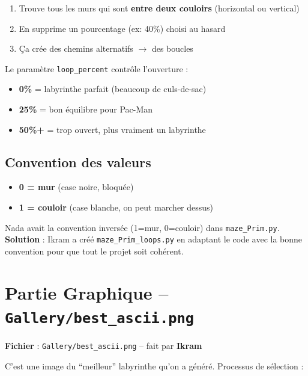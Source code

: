 \documentclass[12pt,a4paper]{article}
\begin{document}
\begin{enumerate}
    \item Trouve tous les murs qui sont \textbf{entre deux couloirs} (horizontal ou vertical)
    \item En supprime un pourcentage (ex: 40\%) choisi au hasard
    \item Ça crée des chemins alternatifs $\rightarrow$ des boucles
\end{enumerate}

Le paramètre \texttt{loop\_percent} contrôle l'ouverture :
\begin{itemize}
    \item \textbf{0\%} = labyrinthe parfait (beaucoup de culs-de-sac)
    \item \textbf{25\%} = bon équilibre pour Pac-Man
    \item \textbf{50\%+} = trop ouvert, plus vraiment un labyrinthe
\end{itemize}

\subsection{Convention des valeurs}

\begin{itemize}
    \item \textbf{0 = mur} (case noire, bloquée)
    \item \textbf{1 = couloir} (case blanche, on peut marcher dessus)
\end{itemize}

\begin{problemebox}
Nada avait la convention inversée (1=mur, 0=couloir) dans \texttt{maze\_Prim.py}. \textbf{Solution} : Ikram a créé \texttt{maze\_Prim\_loops.py} en adaptant le code avec la bonne convention pour que tout le projet soit cohérent.
\end{problemebox}

\section{Partie Graphique -- \texttt{Gallery/best\_ascii.png}}

\textbf{Fichier} : \texttt{Gallery/best\_ascii.png} -- fait par \textbf{Ikram}

C'est une image du ``meilleur'' labyrinthe qu'on a généré. Processus de sélection :
\end{document}
